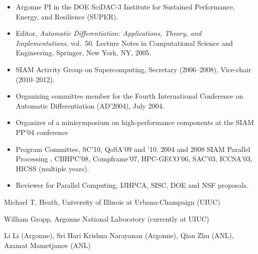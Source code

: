 \begin{itemize}
\setlength{\itemsep}{0.2pt}
\item Argonne PI in the DOE SciDAC-3 Institute for Sustained Performance, Energy, and Resilience (SUPER).
\item Editor, {\em Automatic Differentiation: {A}pplications, Theory, and Implementations}, vol.~50.
 Lecture Notes in Computational Science and Engineering. Springer, New York, NY, 2005.
\item SIAM Activity Group on Supercomputing, Secretary (2006--2008), Vice-chair (2010--2012).
\item Organizing committee member for the Fourth International Conference on Automatic Differentiation (AD'2004), July 2004.
\item Organizer of a minisymposium on high-performance components at the SIAM PP'04 conference
\item Program Committee, SC'10, QoSA'09 and '10, 2004 and 2008 SIAM Parallel Processing , CBHPC'08, Compframe'07, HPC-GECO'06, SAC'03, ICCSA'03, HICSS (multiple years).
\item Reviewer for Parallel Computing, IJHPCA, SISC, DOE and NSF proposals.
\end{itemize}



Michael T. Heath, University of Illinois at Urbana-Champaign (UIUC)

William Gropp, Argonne National Laboratory (currently at UIUC)

  Li Li (Argonne), Sri Hari Krishna Narayanan (Argonne),  Qian Zhu (ANL), Azamat Mametjanov (ANL)


